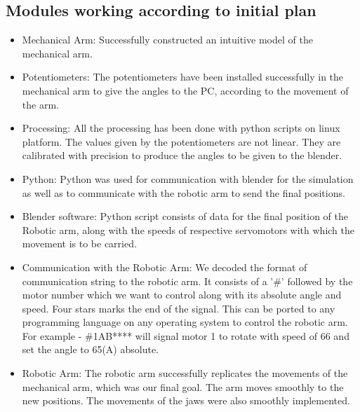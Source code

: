 \documentclass[a4wide]{article}
\begin{document}
\subsection{Modules working according to initial plan}
\begin{itemize}
\item Mechanical Arm: Successfully constructed an intuitive model of the mechanical arm.
\item Potentiometers: The potentiometers have been installed successfully in the mechanical arm to give the angles to the PC, according to the movement of the arm.
\item Processing: All the processing has been done with python scripts on linux platform. The values given by the potentiometers are not linear. They are calibrated with precision to produce the angles to be given to the blender.
\item Python: Python was used for communication with blender for the simulation as well as to communicate with the robotic arm to send the final positions.
\item Blender software: Python script consists of data for the final position of the Robotic arm, along with the speeds of respective servomotors with which the movement is to be carried.
\item Communication with the Robotic Arm: We decoded the format of communication string to the robotic arm. It consists of a '\#' followed by the motor number which we want to control along with its absolute angle and speed. Four stars marks the end of the signal. This can be ported to any programming language on any operating system to control the robotic arm.
For example - \#1AB**** will signal motor 1 to rotate with speed of 66 and set the angle to 65(A) absolute.
\item Robotic Arm: The robotic arm successfully replicates the movements of the mechanical arm, which was our final goal. The arm moves smoothly to the new positions. The movements of the jaws were also smoothly implemented.
\end{itemize}
\end{document}

